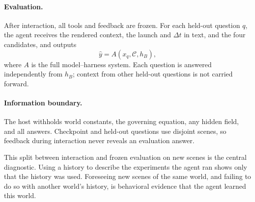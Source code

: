 \paragraph{Evaluation.} After interaction, all tools and feedback are frozen. For each held-out question $q$, the agent receives the rendered context, the launch and $\Delta t$ in text, and the four candidates, and outputs
\begin{equation}
  \hat{y} = A(x_q, \mathcal{C}, h_B),
  \label{eq:agent-objective}
\end{equation}
where $A$ is the full model--harness system. Each question is answered independently from $h_B$; context from other held-out questions is not carried forward.

\paragraph{Information boundary.} The host withholds world constants, the governing equation, any hidden field, and all answers. Checkpoint and held-out questions use disjoint scenes, so feedback during interaction never reveals an evaluation answer.

This split between interaction and frozen evaluation on new scenes is the central diagnostic. Using a history to describe the experiments the agent ran shows only that the history was used. Foreseeing new scenes of the same world, and failing to do so with another world's history, is behavioral evidence that the agent learned this world.
